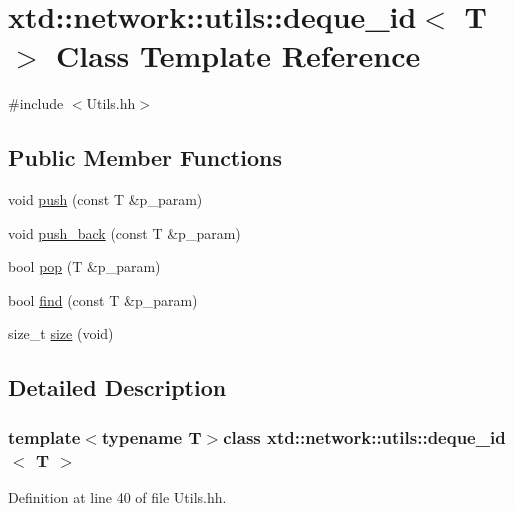 \hypertarget{classxtd_1_1network_1_1utils_1_1deque__id}{\section{xtd\-:\-:network\-:\-:utils\-:\-:deque\-\_\-id$<$ T $>$ Class Template Reference}
\label{classxtd_1_1network_1_1utils_1_1deque__id}
}


{\ttfamily \#include $<$Utils.\-hh$>$}

\subsection*{Public Member Functions}
\begin{DoxyCompactItemize}
\item 
void \hyperlink{classxtd_1_1network_1_1utils_1_1deque__id_ace5bd507db72397f457723944c21b575}{push} (const T \&p\-\_\-param)
\item 
void \hyperlink{classxtd_1_1network_1_1utils_1_1deque__id_ae947d106bc8943450c1eab9df3880401}{push\-\_\-back} (const T \&p\-\_\-param)
\item 
bool \hyperlink{classxtd_1_1network_1_1utils_1_1deque__id_a4d61e0412fbc4bb454141e8f760d191b}{pop} (T \&p\-\_\-param)
\item 
bool \hyperlink{classxtd_1_1network_1_1utils_1_1deque__id_ad18ee554089fe3016e1dd4c7b363c6a8}{find} (const T \&p\-\_\-param)
\item 
size\-\_\-t \hyperlink{classxtd_1_1network_1_1utils_1_1deque__id_a6038f59387bc5dcffb339b0d8c9424fa}{size} (void)
\end{DoxyCompactItemize}


\subsection{Detailed Description}
\subsubsection*{template$<$typename T$>$class xtd\-::network\-::utils\-::deque\-\_\-id$<$ T $>$}



Definition at line 40 of file Utils.\-hh.



